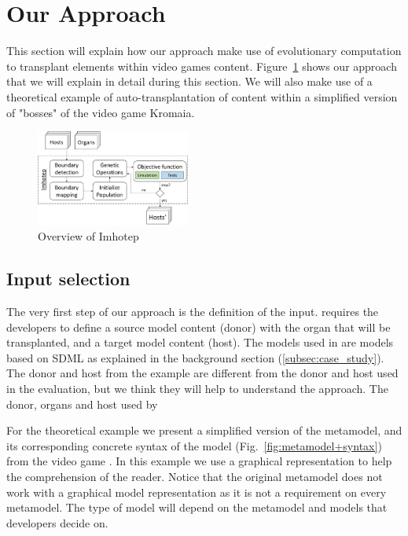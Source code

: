 \section{Our \ApproachName{} Approach} \label{sec:Approach}

This section will explain how our approach make use of evolutionary computation to transplant elements within video games content. Figure~\ref{fig:approach} shows our \ApproachName{} approach that we will explain in detail during this section. We will also make use of a theoretical example of auto-transplantation of content within a simplified version of "bosses" of the video game Kromaia.

\begin{figure}[h]
    \centering
    \includegraphics[width=0.45\textwidth]{Figures/overview.png}
    \caption{Overview of Imhotep}
    \label{fig:approach}
\end{figure}


\subsection{Input selection}

The very first step of our approach is the definition of the input. \ApproachName{} requires the developers to define a source model content (donor) with the organ that will be transplanted, and a target model content (host). The models used in \ApproachName{} are models based on SDML as explained in the background section (\ref{subsec:case_study}). The donor and host from the example are different from the donor and host used in the evaluation, but we think they will help to understand the approach. The donor, organs and host used by \ApproachName{}

For the theoretical example we present a simplified version of the metamodel, and its corresponding concrete syntax of the model (Fig.~\ref{fig:metamodel+syntax}) from the video game \CaseStudy{}. In this example we use a graphical representation to help the comprehension of the reader. Notice that the original metamodel does not work with a graphical model representation as it is not a requirement on every metamodel. The type of model will depend on the metamodel and models that developers decide on.


